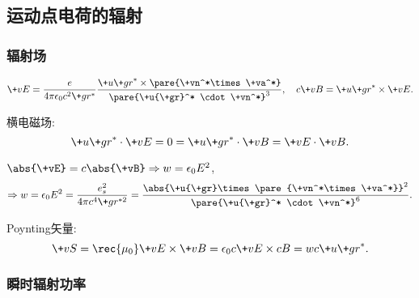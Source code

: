 \documentclass[hidelinks]{ctexart}
\begin{document}


\subsection{运动点电荷的辐射} %
\label{sub:运动点电荷的辐射}

\subsubsection{辐射场} %
\label{ssub:辐射场}

\vspace{-\baselineskip}
\[ \+vE = \frac{e}{4\pi\epsilon_0 c^2 \+gr^*}\frac{\+u{\+gr}^*\times \pare{\+vn^*\times \+va^*}}{\pare{\+u{\+gr}^* \cdot \+vn^*}^3},\quad c\+vB = \+u{\+gr}^*\times \+vE. \]
\begin{cenum}
    \item 横电磁场:
    \[ \+u{\+gr}^*\cdot \+vE = 0 = \+u{\+gr}^*\cdot \+vB = \+vE\cdot \+vB. \]
    \item $\abs{\+vE} = c\abs{\+vB} \Rightarrow w = \epsilon_0 E^2$,
    \[ \Rightarrow w = \epsilon_0 E^2 = \frac{e_s^2}{4\pi c^4 \+gr^{*2}} = \frac{\abs{\+u{\+gr}\times \pare{\+vn^*\times \+va^*}}^2}{\pare{\+u{\+gr}^* \cdot \+vn^*}^6}. \]
    \item Poynting矢量:
    \[ \+vS = \rec{\mu_0}\+vE\times \+vB = \epsilon_0 c\+vE\times cB = wc\+u{\+gr}^*. \]
\end{cenum}


\subsubsection{瞬时辐射功率} %
\label{ssub:瞬时辐射功率}
\end{document}
